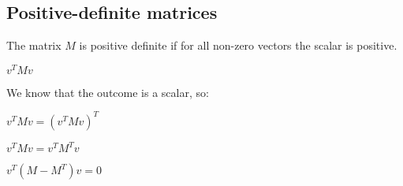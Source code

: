 
\subsection{Positive-definite matrices}

The matrix \(M\) is positive definite if for all non-zero vectors the scalar is positive.

\(v^TMv\)

We know that the outcome is a scalar, so:

\(v^TMv=(v^TMv)^T\)

\(v^TMv=v^TM^Tv\)

\(v^T(M-M^T)v=0\)


